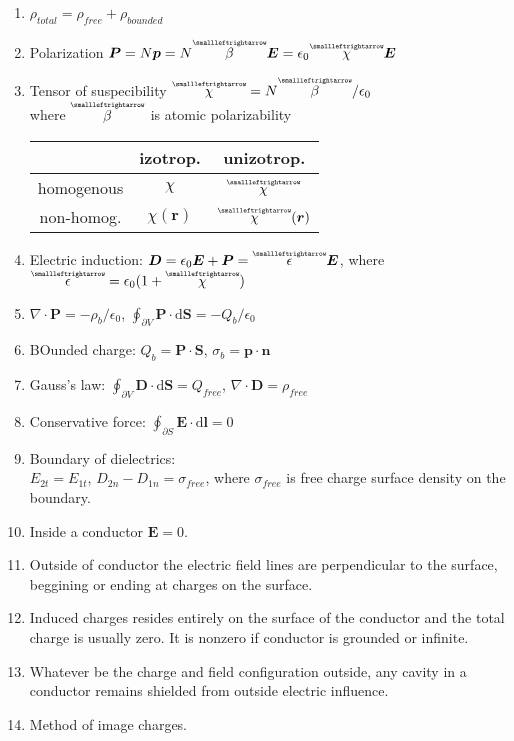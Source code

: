 \documentclass{article}
\renewcommand\d{\mathrm d}
\newcommand{\tensor}[1]{\overset{\scriptscriptstyle\smallleftrightarrow}{#1}}
\begin{document}
\begin{multicols}{3}

    \begin{enumerate}
        \item $\rho_{total}=\rho_{free}+\rho_{bounded}$
        \item Polarization $\bm P=N\bm p=N\tensor\beta\bm E=\epsilon_0\tensor\chi\bm E$
        \item Tensor of suspecibility $\tensor\chi=N\tensor\beta/\epsilon_0$\\
        where $\tensor\beta$ is atomic polarizability\\
        \begin{tabular}{|c|c|c|}
            \hline
             & izotrop. & unizotrop. \rule{0pt}{2ex}\\\hline
            homogenous & $\chi$ & $\tensor\chi$ \rule{0pt}{2ex}\\\hline
            non-homog. & $\chi(\bm r)$ & $\tensor\chi(\bm r)$ \rule{0pt}{2ex}\\\hline
        \end{tabular}
        \item Electric induction: $\bm D=\epsilon_0\bm E+\bm P=\tensor\epsilon\bm E$, where $\tensor\epsilon=\epsilon_0(1+\tensor\chi)$
        \item $\nabla\cdot\bm P=-\rho_{b}/\epsilon_0$, $\oint_{\partial V}\bm P\cdot\d\bm S=-Q_{b}/\epsilon_0$
        \item BOunded charge: $Q_{b}=\bm P\cdot\bm S$, $\sigma_b=\bm p\cdot\bm n$
        \item Gauss's law: $\oint_{\partial V}\bm D\cdot\d\bm S=Q_{free}$, $\nabla\cdot\bm D=\rho_{free}$
        \item Conservative force: $\oint_{\partial S}\bm E\cdot\d\bm l=0$
        \item Boundary of dielectrics:\\$E_{2t}=E_{1t}$, $D_{2n}-D_{1n}=\sigma_{free}$, where $\sigma_{free}$ is free charge surface density on the boundary.
        \item Inside a conductor $\bm E=0$.
        \item Outside of conductor the electric field lines are perpendicular to the surface, beggining or ending at charges on the surface.
        \item Induced charges resides entirely on the surface of the conductor and the total charge is usually zero. It is nonzero if conductor is grounded or infinite.
        \item Whatever be the charge and field configuration outside, any cavity in a conductor remains shielded from outside electric influence.
        \item Method of image charges.


\end{enumerate}
\end{multicols}
\end{document}
